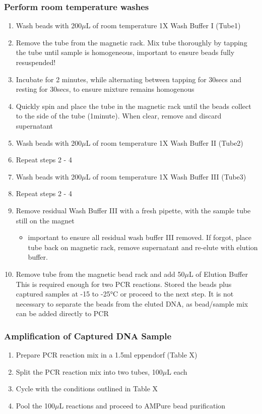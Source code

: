 \subsubsection{Perform room temperature washes}
\begin{enumerate}
	\item Wash beads with 200$\mu$L of room temperature 1X Wash Buffer I (Tube1) 
	\item Remove the tube from the magnetic rack. Mix tube thoroughly by tapping the tube until sample is homogeneous, important to ensure beads fully resuspended! 
	\item Incubate for 2 minutes, while alternating between tapping for 30secs and resting for 30secs, to ensure mixture remains homogenous 
	\item Quickly spin and place the tube in the magnetic rack until the beads collect to the side of the tube (1minute). When clear, remove and discard supernatant
	\item Wash beads with 200$\mu$L of room temperature 1X Wash Buffer II (Tube2) 
	\item Repeat steps 2 - 4
	\item Wash beads with 200$\mu$L of room temperature 1X Wash Buffer III (Tube3) 
	\item Repeat steps 2 - 4
	\item Remove residual Wash Buffer III with a fresh pipette, with the sample tube still on the magnet
	\begin{itemize}	
		\item important to ensure all residual wash buffer III removed. If forgot, place tube back on magnetic rack, remove supernatant and re-elute with elution buffer.
	\end{itemize}  
	\item Remove tube from the magnetic bead rack and add 50$\mu$L of Elution Buffer
	This is required enough for two PCR reactions. Stored the beads plus captured samples at -15 to -25°C or proceed to the next step. It is not necessary to separate the beads from the eluted DNA, as bead/sample mix can be added directly to PCR
\end{enumerate}

\subsubsection{Amplification of Captured DNA Sample}
\begin{enumerate}
	\item Prepare PCR reaction mix in a 1.5ml eppendorf (Table X) 
	\item Split the PCR reaction mix into two tubes, 100$\mu$L each 
	\item Cycle with the conditions outlined in Table X 
	\item Pool the 100$\mu$L reactions and proceed to AMPure bead purification 
\end{enumerate}
\

